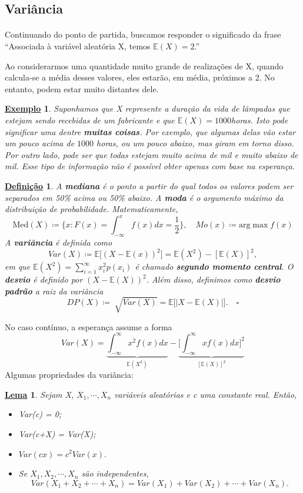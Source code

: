 \documentclass{article}
\newtheorem*{def*}{\underline{Defini\c c\~ao}}
\newtheorem*{lemma*}{\underline{Lema}}
\newtheorem{example}{\underline{Exemplo}}
\begin{document}
\subsection{Variância}
\paragraph{} Continuando do ponto de partida, buscamos responder o significado da frase ``Associada à variável
aleatória X, temos \(\mathbb{E}(X) = 2\).''

  Ao considerarmos uma quantidade muito grande de realizações de X, quando calcula-se a média desses valores,
eles estarão, em média, próximos a 2. No entanto, podem estar muito distantes dele.
\begin{example}
  Suponhamos que X represente a duração da vida de lâmpadas que estejam sendo recebidas de um fabricante e que \(\mathbb{E}(X) = 1000\)horas.
Isto pode significar uma dentre \textbf{muitas coisas}. Por exemplo, que algumas delas vão estar um pouco acima de \(1000\) horas,
ou um pouco abaixo, mas giram em torno disso. Por outro lado, pode ser que todas estejam muito acima de mil e muito abaixo de mil.
Esse tipo de informação não é possível obter apenas com base na esperança.
\end{example}
\begin{def*}
  A \textbf{mediana} é o ponto a partir do qual todos os valores podem ser separados em 50\% acima ou 50\% abaixo. A \textbf{moda} é
o argumento máximo da distribuição de probabilidade. Matematicamente, 
  \[
    \text{Med}(X) \coloneqq \biggl\{x: F(x) = \int_{-\infty}^{x}f(x)dx = \frac{1}{2}\biggr\} ,\quad Mo(x) \coloneqq \text{arg}\max{f(x)}
  \]
  A \textbf{variância} é definida como 
    \[
      Var(X)\coloneqq \mathbb{E}\biggl[(X-\mathbb{E}(x))^{2}\biggr] = \mathbb{E}(X^{2}) - [\mathbb{E}(X)]^{2},
    \]
  em que \(\mathbb{E}(X^{2}) = \sum\limits_{i=1}^{\infty}x_{i}^{2}p(x_{i})\) é chamado \textbf{segundo momento central}.
  O \textbf{desvio} é definido por \((X-\mathbb{E}(X))^{2}\). Além disso, definimos como \textbf{desvio padrão} a 
raiz da variância 
  \[
    DP(X) \coloneqq  \sqrt[]{Var(X)} = \mathbb{E}\biggl[|X-\mathbb{E}(X)|\biggr].\quad\square
  \]
\end{def*}
  No caso contínuo, a esperança assume a forma 
    \[
      Var(X) = \underbrace{\int_{-\infty}^{\infty}x^{2}f(x)dx}_{\mathbb{E}(X^{2})} - \underbrace{\biggl[\int_{-\infty}^{\infty}xf(x)dx\biggr]^{2}}_{[\mathbb{E}(X)]^{2}}
    \]
  Algumas propriedades da variância: 
 \begin{lemma*}
   Sejam X, \(X_{1}, \cdots, X_{n}\) variáveis aleatórias e c uma constante real. Então, 
  \begin{itemize}
    \item[a)] Var(c) = 0;
    \item[b)] Var(c+X) = Var(X);
    \item[c)] \(Var(cx) =c^{2}Var(x).\)
    \item[d)] Se \(X_{1}, X_{2}, \cdots, X_{n}\) são independentes, 
      \[
        Var(X_{1}+X_{2}+\cdots+X_{n}) = Var(X_{1})+Var(X_{2})+\cdots+Var(X_{n}).
      \]
  \end{itemize}
 \end{lemma*}
\end{document}
